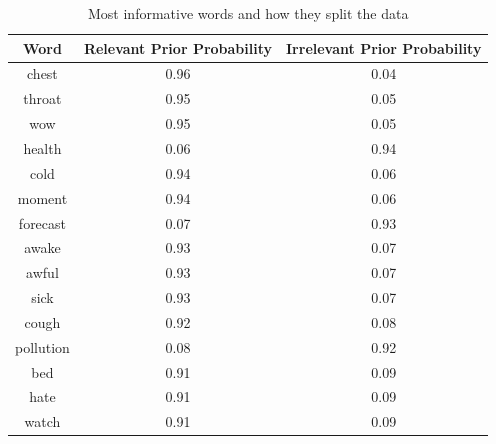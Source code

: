 \documentclass[10pt,letterpaper]{article}
\begin{document}
\begin{table}[h!]
\centering
\begin{tabular}{ | c | c | c |}
  \hline
   \textbf{Word} & \textbf{Relevant Prior Probability} & \textbf{Irrelevant Prior Probability}\\
  \hline
  chest & 0.96 & 0.04\\
  \hline
  throat & 0.95 & 0.05\\
  \hline
  wow & 0.95 & 0.05\\
  \hline
  health & 0.06 & 0.94\\
  \hline
  cold & 0.94 & 0.06\\
  \hline
  moment & 0.94 & 0.06\\
  \hline
  forecast & 0.07 & 0.93\\
  \hline
  awake & 0.93 & 0.07\\
  \hline
  awful & 0.93 & 0.07\\
  \hline
  sick & 0.93 & 0.07\\
  \hline
  cough & 0.92 & 0.08\\
  \hline
  pollution & 0.08 & 0.92\\
  \hline
  bed & 0.91 & 0.09\\
  \hline
  hate & 0.91 & 0.09\\
  \hline
  watch & 0.91 & 0.09\\
  \hline
\end{tabular}
\caption{Most informative words and how they split the data}
\label{table:7}
\end{table}
\end{document}
